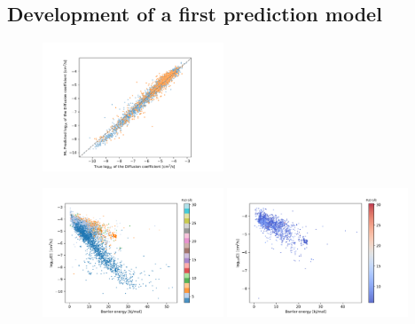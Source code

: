 \documentclass[main]{subfiles}
\begin{document}
\subsection{Development of a first prediction model}

\begin{figure}[ht]
  \centering
    \includegraphics[width=0.48\textwidth]{figures/5-diffusion/diffusion_prediction.pdf}
    \caption{}\label{fgr:}
\end{figure}

\begin{figure}[ht]
  \centering
    \includegraphics[width=0.48\textwidth]{figures/5-diffusion/difflog_barrier_Df_uff.pdf}
    \includegraphics[width=0.48\textwidth]{figures/5-diffusion/difflog_barrier_Df_uff_2.pdf}
    \caption{}\label{fgr:}
\end{figure}
\end{document}
